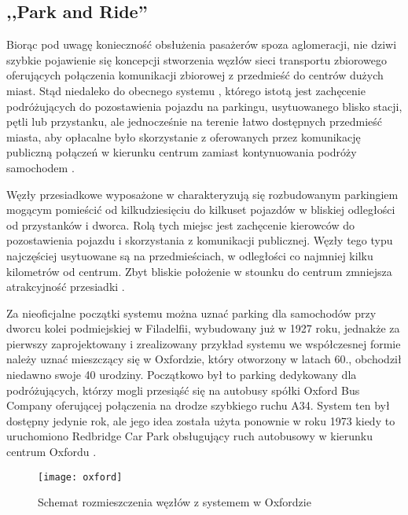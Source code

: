\documentclass[twoside,12pt]{article}
\begin{document}
	\subsection{,,Park and Ride''}
	
	Biorąc pod uwagę konieczność obsłużenia pasażerów spoza aglomeracji, nie dziwi szybkie pojawienie się koncepcji stworzenia węzłów sieci transportu zbiorowego oferujących połączenia komunikacji zbiorowej z przedmieść do centrów dużych miast. Stąd niedaleko do obecnego systemu \pnr{}, którego istotą jest zachęcenie podróżujących do pozostawienia pojazdu na parkingu, usytuowanego blisko stacji, pętli lub przystanku, ale jednocześnie na terenie łatwo dostępnych przedmieść miasta, aby opłacalne było skorzystanie z oferowanych przez komunikację publiczną połączeń w kierunku centrum zamiast kontynuowania podróży samochodem \cite{szarata}.	
	
	Węzły przesiadkowe wyposażone w \pnr{} charakteryzują się rozbudowanym parkingiem mogącym pomieścić od kilkudziesięciu do kilkuset pojazdów w bliskiej odległości od przystanków i dworca. Rolą tych miejsc jest zachęcenie kierowców do pozostawienia pojazdu i skorzystania z komunikacji publicznej. Węzły tego typu najczęściej usytuowane są na przedmieściach, w odległości co najmniej kilku kilometrów od centrum. Zbyt bliskie położenie w stounku do centrum zmniejsza atrakcyjność przesiadki \cite{szarata}.
	
	Za nieoficjalne początki systemu \pnr{} można uznać parking dla samochodów przy dworcu kolei podmiejskiej w Filadelfii, wybudowany już w 1927 roku, jednakże za pierwszy zaprojektowany i zrealizowany przykład systemu \pnr{} we współczesnej formie należy uznać mieszczący się w Oxfordzie, który otworzony w latach 60., obchodził niedawno swoje 40 urodziny. Początkowo był to parking dedykowany dla podróżujących, którzy mogli przesiąść się na autobusy spółki Oxford Bus Company oferującej połączenia na drodze szybkiego ruchu A34. System ten był dostępny jedynie rok, ale jego idea została użyta ponownie w roku 1973 kiedy to uruchomiono Redbridge Car Park obsługujący ruch autobusowy w kierunku centrum Oxfordu \cite{oxford}.
	
	\begin{figure}[H]
		\centering
		\texttt{[image: oxford]}\\
		\caption{Schemat rozmieszczenia węzłów z systemem \pnr{} w Oxfordzie}
	\end{figure}
	
\end{document}
